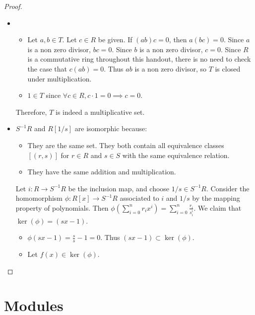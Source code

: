 \documentclass[12pt, psamsfonts]{amsart}
\theoremstyle{definition}
\theoremstyle{remark}
\numberwithin{equation}{section}
\begin{document}
\begin{proof}
  $ $
  \begin{itemize}
    \item
      \begin{itemize}
        \item
          Let $a, b \in T$.
          Let $c \in R$ be given.
          If $(ab)c = 0$, then $a(bc) = 0$.
          Since $a$ is a non zero divisor, $bc = 0$.
          Since $b$ is a non zero divisor, $c = 0$.
          Since $R$ is a commutative ring throughout this handout, there is no need to check the case that $c(ab) = 0$.
          Thus $ab$ is a non zero divisor, so $T$ is closed under multiplication.
        \item
          $1 \in T$ since $\forall c \in R, c \cdot 1 = 0 \implies c = 0$.
      \end{itemize}

      Therefore, $T$ is indeed a multiplicative set.
    \item
      $S^{-1}R$ and $R[1/s]$ are isomorphic because:
      \begin{itemize}
        \item
          They are the same set.
          They both contain all equivalence classes $[(r, s)]$ for $r \in R$ and $s \in S$ with the same equivalence relation.
        \item
          They have the same addition and multiplication.
      \end{itemize}

      Let $i: R \rightarrow S^{-1}R$ be the inclusion map, and choose $1/s \in S^{-1}R$.
      Consider the homomorphism $\phi: R[x] \rightarrow S^{-1}R$ associated to $i$ and $1/s$ by the mapping property of polynomials.
      Then $\phi(\sum_{i=0}^n r_ix^i) = \sum_{i=0}^n \frac{r_i}{s_i^i}$.
      We claim that $\ker(\phi) = (sx - 1)$.
      \begin{itemize}
        \item
          $\phi(sx - 1) = \frac{s}{s} - 1 = 0$.
          Thus $(sx - 1) \subset \ker(\phi)$.
        \item
          Let $f(x) \in \ker(\phi)$.
      \end{itemize}
  \end{itemize}
\end{proof}

\section{Modules}
\end{document}
